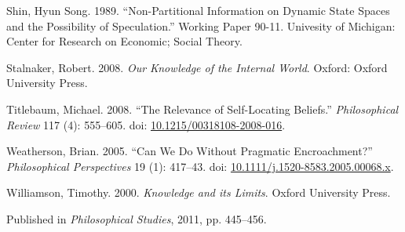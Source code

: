 \documentclass[
  11pt,
  letterpaper,
  DIV=11,
  numbers=noendperiod,
  twoside]{scrartcl}
\newlength{\cslhangindent}
\newenvironment{CSLReferences}[2] %
 {\begin{list}{}{%
  \setlength{\itemindent}{0pt}
  \setlength{\leftmargin}{0pt}
  \setlength{\parsep}{0pt}
  \ifodd #1
   \setlength{\leftmargin}{\cslhangindent}
   \setlength{\itemindent}{-1\cslhangindent}
  \fi
  \setlength{\itemsep}{#2\baselineskip}}}
 {\end{list}}
\begin{document}
\begin{CSLReferences}{1}{0}
Shin, Hyun Song. 1989. {``Non-Partitional Information on Dynamic State
Spaces and the Possibility of Speculation.''} Working Paper 90-11.
Univesity of Michigan: Center for Research on Economic; Social Theory.

Stalnaker, Robert. 2008. \emph{Our Knowledge of the Internal World}.
Oxford: Oxford University Press.

Titlebaum, Michael. 2008. {``The Relevance of Self-Locating Beliefs.''}
\emph{Philosophical Review} 117 (4): 555--605. doi:
\href{https://doi.org/10.1215/00318108-2008-016}{10.1215/00318108-2008-016}.

Weatherson, Brian. 2005. {``{Can We Do Without Pragmatic
Encroachment?}''} \emph{Philosophical Perspectives} 19 (1): 417--43.
doi:
\href{https://doi.org/10.1111/j.1520-8583.2005.00068.x}{10.1111/j.1520-8583.2005.00068.x}.

Williamson, Timothy. 2000. \emph{{Knowledge and its Limits}}. Oxford
University Press.

\end{CSLReferences}



\noindent Published in\emph{
Philosophical Studies}, 2011, pp. 445–456.
\end{document}
